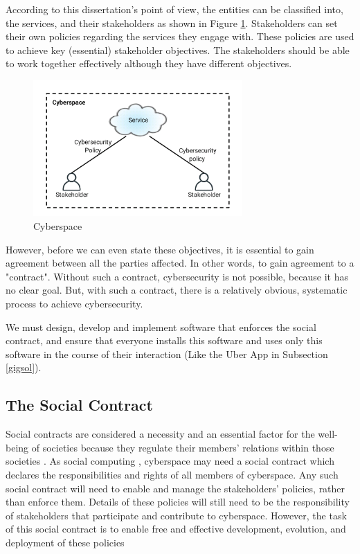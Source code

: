 According to this dissertation's point of view, the entities can be classified into, the services, and their stakeholders as shown in Figure \ref{Cyberspacefig}. Stakeholders can set their own policies regarding the services they engage with. These policies are used to achieve key (essential) stakeholder objectives. The stakeholders should be able to work together effectively although they have different objectives.
\begin{figure}
	\centering
		\includegraphics[width=8cm]{figures/Cyberspace.png}
\caption{Cyberspace}
\label{Cyberspacefig}
\end{figure}
 However, before we can even state these objectives, it is essential to gain agreement between all the parties affected. In other words, to gain agreement to a "contract". Without such a contract, cybersecurity is not possible, because it has no clear goal. But, with such a contract, there is a relatively obvious, systematic process to achieve cybersecurity. 
 
We must design, develop and implement software that enforces the social contract, and ensure that everyone installs this software and uses only this software in the course of their interaction (Like the Uber App in Subsection \ref{gigsol}).


\subsection{The Social Contract}
Social contracts are considered a necessity and an essential factor for the well-being of societies because they regulate their members' relations within those societies \cite{Leviathan}. As social computing \cite{parameswaran2007social}, cyberspace may need a social contract which declares the responsibilities and rights of all members of cyberspace. Any such social contract will need to enable and manage the stakeholders' policies, rather than enforce them. Details of these policies will still need to be the responsibility of stakeholders that participate and contribute to cyberspace. However, the task of this social contract is to enable free and effective development, evolution, and deployment of these policies

